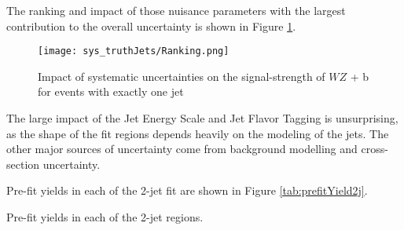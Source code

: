 The ranking and impact of those nuisance parameters with the largest contribution to the overall uncertainty is shown in Figure \ref{fig:ranking_1j}.

\begin{figure}[H]
    \centering
    \texttt{[image: sys\_truthJets/Ranking.png]}
    \caption{Impact of systematic uncertainties on the signal-strength of $WZ$ + b for events with exactly one jet}
    \label{fig:ranking_1j}
\end{figure}

The large impact of the Jet Energy Scale and Jet Flavor Tagging is unsurprising, as the shape of the fit regions depends heavily on the modeling of the jets. The other major sources of uncertainty come from background modelling and cross-section uncertainty. %




Pre-fit yields in each of the 2-jet fit are shown in Figure \ref{tab:prefitYield2j}.

\begin{table}[H]
\begin{adjustwidth}{-3em}{-3em}
\small

\label{tab:prefitYield2j}
\caption{Pre-fit yields in each of the 2-jet regions.}                                     
\end{adjustwidth}
\end{table}

